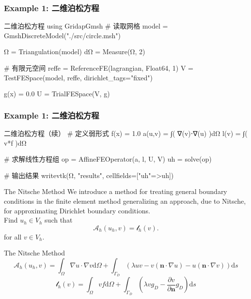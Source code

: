 \documentclass[lang=en,aspectratio=43,theme=default,logo=on]{simplebeamer}
\begin{document}
\begin{frame}[fragile]
    \frametitle{Example 1: 二维泊松方程}
\begin{codex}{1}{二维泊松方程}
using GridapGmsh
# 读取网格
model = GmshDiscreteModel("./src/circle.msh")

Ω = Triangulation(model)
dΩ = Measure(Ω, 2)

# 有限元空间
reffe = ReferenceFE(lagrangian, Float64, 1)
V = TestFESpace(model, reffe, dirichlet_tags="fixed")

g(x) = 0.0
U = TrialFESpace(V, g)
\end{codex}
\end{frame}

\begin{frame}[fragile]
    \frametitle{Example 1: 二维泊松方程}
\begin{codex}{14}{二维泊松方程（续）}
# 定义弱形式
f(x) = 1.0
a(u,v) = ∫( ∇(v)⋅∇(u) )dΩ
l(v) = ∫( v*f )dΩ

# 求解线性方程组
op = AffineFEOperator(a, l, U, V)
uh = solve(op)

# 输出结果
writevtk(Ω, "results", cellfields=["uh"=>uh])
\end{codex}
\end{frame}

\begin{frame}{The Nitsche Method}
    We introduce a method for treating general boundary conditions in the finite element method generalizing an approach, due to Nitsche, for approximating Dirichlet boundary conditions. \\
    Find $u_h \in V_h$ such that
    \begin{equation*}
        \mathcal{A}_h(u_h,v)=\mathcal{l}_h(v).
    \end{equation*}
    for all $v \in V_h$. \\
\end{frame}

\begin{frame}{The Nitsche Method}
    \begin{equation*}
        \mathcal{A}_h(u_h,v) = \int_{\Omega}{\nabla u \cdot \nabla v}\mathrm{d}\Omega + \int_{\Gamma_D}{\left( \lambda uv-v(\mathbf{n}\cdot \nabla u) -u(\mathbf{n}\cdot \nabla v)\right) }\mathrm{d}s
    \end{equation*}
    \begin{equation*}
        \mathcal{l}_h(v)=\int_{\Omega}{vf}\mathrm{d}\Omega  + \int_{\Gamma_D}{\left( \lambda vg_D-\dfrac{\partial v}{\partial \mathbf{n}}g_D \right) }\mathrm{d}s
    \end{equation*}
\end{frame}
\end{document}
